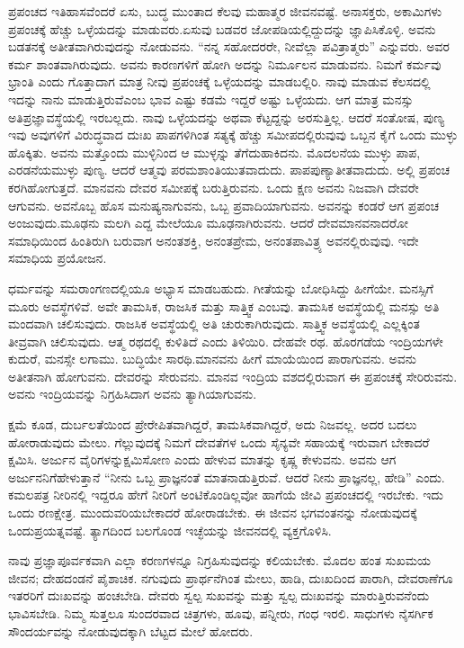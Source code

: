 ಪ್ರಪಂಚದ ಇತಿಹಾಸವೆಂದರೆ ಏಸು, ಬುದ್ಧ ಮುಂತಾದ ಕೆಲವು ಮಹಾತ್ಮರ ಜೀವನವಷ್ಟೆ. ಅನಾಸಕ್ತರು, ಅಕಾಮಿಗಳು ಪ್ರಪಂಚಕ್ಕೆ ಹೆಚ್ಚು ಒಳ್ಳೆಯದನ್ನು ಮಾಡುವರು.\break ಏಸುವು ಬಡವರ ಜೋಪಡಿಯಲ್ಲಿದ್ದುದನ್ನು ಜ್ಞಾಪಿಸಿಕೊಳ್ಳಿ. ಅವನು ಬಡತನಕ್ಕೆ ಅತೀತವಾಗಿ\-ರುವುದನ್ನು ನೋಡುವನು. “ನನ್ನ ಸಹೋದರರೇ, ನೀವೆಲ್ಲಾ ಪವಿತ್ರಾತ್ಮರು” ಎನ್ನುವರು. ಅವರ ಕರ್ಮ ಶಾಂತವಾಗಿರುವುದು. ಅವನು ಕಾರಣಗಳಿಗೆ ಹೋಗಿ ಅದನ್ನು ನಿರ್ಮೂಲನ ಮಾಡುವನು. ನಿಮಗೆ ಕರ್ಮವು ಭ್ರಾಂತಿ ಎಂದು ಗೊತ್ತಾದಾಗ ಮಾತ್ರ ನೀವು ಪ್ರಪಂಚಕ್ಕೆ ಒಳ್ಳೆಯದನ್ನು ಮಾಡಬಲ್ಲಿರಿ. ನಾವು ಮಾಡುವ ಕೆಲಸದಲ್ಲಿ ಇದನ್ನು ನಾನು ಮಾಡುತ್ತಿರುವೆ\break ಎಂಬ ಭಾವ ಎಷ್ಟು ಕಡಮೆ ಇದ್ದರೆ ಅಷ್ಟು ಒಳ್ಳೆಯದು. ಆಗ ಮಾತ್ರ ಮನಸ್ಸು ಅತಿಪ್ರಜ್ಞಾವಸ್ಥೆಯಲ್ಲಿ ಇರಬಲ್ಲದು. ನಾವು ಒಳ್ಳೆಯದನ್ನು ಅಥವಾ ಕೆಟ್ಟದ್ದನ್ನು ಅರಸುತ್ತಿಲ್ಲ. ಆದರೆ ಸಂತೋಷ, ಪುಣ್ಯ ಇವು ಅವುಗಳಿಗೆ ವಿರುದ್ಧವಾದ ದುಃಖ ಪಾಪಗಳಿಗಿಂತ ಸತ್ಯಕ್ಕೆ ಹೆಚ್ಚು ಸಮೀಪದಲ್ಲಿರುವುವು ಒಬ್ಬನ ಕೈಗೆ ಒಂದು ಮುಳ್ಳು ಹೊಕ್ಕಿತು. ಅವನು ಮತ್ತೊಂದು ಮುಳ್ಳಿನಿಂದ ಆ ಮುಳ್ಳನ್ನು ತೆಗೆದುಹಾಕಿದನು. ಮೊದಲನೆಯ ಮುಳ್ಳು ಪಾಪ, ಎರಡನೆಯ\break ಮುಳ್ಳು ಪುಣ್ಯ. ಆದರೆ ಆತ್ಮವು ಪರಮಶಾಂತಿಯುತವಾದುದು. ಪಾಪಪುಣ್ಯಾತೀತ\break ವಾದುದು. ಅಲ್ಲಿ ಪ್ರಪಂಚ ಕರಗಿಹೋಗುತ್ತದೆ. ಮಾನವನು ದೇವರ ಸಮೀಪಕ್ಕೆ ಬರುತ್ತಿರುವನು. ಒಂದು ಕ್ಷಣ ಅವನು ನಿಜವಾಗಿ ದೇವರೇ ಆಗುವನು. ಅವನೊಬ್ಬ ಹೊಸ ಮನುಷ್ಯನಾಗುವನು, ಒಬ್ಬ ಪ್ರವಾದಿಯಾಗುವನು. ಅವನನ್ನು ಕಂಡರೆ ಆಗ ಪ್ರಪಂಚ ಅಂಜುವುದು.\break ಮೂಢನು ಮಲಗಿ ಎದ್ದ ಮೇಲೆಯೂ ಮೂಢನಾಗಿರುವನು. ಆದರೆ ದೇವಮಾನವನಾದರೋ ಸಮಾಧಿಯಿಂದ ಹಿಂತಿರುಗಿ ಬರುವಾಗ ಅನಂತಶಕ್ತಿ, ಅನಂತಪ್ರೇಮ, ಅನಂತಪಾವಿತ್ರ್ಯ ಅವನಲ್ಲಿರುವುವು. ಇದೇ ಸಮಾಧಿಯ ಪ್ರಯೋಜನ.

ಧರ್ಮವನ್ನು ಸಮರಾಂಗಣದಲ್ಲಿಯೂ ಅಭ್ಯಾಸ ಮಾಡಬಹುದು. ಗೀತೆಯನ್ನು ಬೋಧಿಸಿದ್ದು ಹೀಗೆಯೇ. ಮನಸ್ಸಿಗೆ ಮೂರು ಅವಸ್ಥೆಗಳಿವೆ. ಅವೇ ತಾಮಸಿಕ, ರಾಜಸಿಕ ಮತ್ತು ಸಾತ್ತ್ವಿಕ ಎಂಬವು. ತಾಮಸಿಕ ಅವಸ್ಥೆಯಲ್ಲಿ ಮನಸ್ಸು ಅತಿ ಮಂದವಾಗಿ ಚಲಿಸುವುದು. ರಾಜಸಿಕ ಅವಸ್ಥೆಯಲ್ಲಿ ಅತಿ ಚುರುಕಾಗಿರುವುದು. ಸಾತ್ತ್ವಿಕ ಅವಸ್ಥೆಯಲ್ಲಿ ಎಲ್ಲಕ್ಕಿಂತ ತೀವ್ರವಾಗಿ ಚಲಿಸುವುದು. ಆತ್ಮ ರಥದಲ್ಲಿ ಕುಳಿತಿದೆ ಎಂದು ತಿಳಿಯಿರಿ. ದೇಹವೇ ರಥ. ಹೊರಗಡೆಯ ಇಂದ್ರಿಯಗಳೇ ಕುದುರೆ, ಮನಸ್ಸೇ ಲಗಾಮು. ಬುದ್ಧಿಯೇ ಸಾರಥಿ.\break ಮಾನವನು ಹೀಗೆ ಮಾಯೆಯಿಂದ ಪಾರಾಗುವನು. ಅವನು ಅತೀತನಾಗಿ ಹೋಗುವನು. ದೇವರನ್ನು ಸೇರುವನು. ಮಾನವ ಇಂದ್ರಿಯ ವಶದಲ್ಲಿರುವಾಗ ಈ ಪ್ರಪಂಚಕ್ಕೆ ಸೇರಿರುವನು. ಅವನು ಇಂದ್ರಿಯವನ್ನು ನಿಗ್ರಹಿಸಿದಾಗ ಅವನು ತ್ಯಾಗಿಯಾಗುವನು.

ಕ್ಷಮೆ ಕೂಡ, ದುರ್ಬಲತೆಯಿಂದ ಪ್ರೇರೇಪಿತವಾಗಿದ್ದರೆ, ತಾಮಸಿಕವಾಗಿದ್ದರೆ, ಅದು ನಿಜವಲ್ಲ. ಅದರ ಬದಲು ಹೋರಾಡುವುದು ಮೇಲು. ಗೆಲ್ಲುವುದಕ್ಕೆ ನಿಮಗೆ ದೇವತೆಗಳ ಒಂದು ಸೈನ್ಯವೇ ಸಹಾಯಕ್ಕೆ ಇರುವಾಗ ಬೇಕಾದರೆ ಕ್ಷಮಿಸಿ. ಅರ್ಜುನ ವೈರಿಗಳನ್ನು\break ಕ್ಷಮಿಸೋಣ ಎಂದು ಹೇಳುವ ಮಾತನ್ನು ಕೃಷ್ಣ ಕೇಳುವನು. ಅವನು ಆಗ ಅರ್ಜುನನಿಗೆ\break ಹೇಳುತ್ತಾನೆ “ನೀನು ಒಬ್ಬ ಪ್ರಾಜ್ಞನಂತೆ ಮಾತನಾಡುತ್ತಿರುವೆ. ಆದರೆ ನೀನು ಪ್ರಾಜ್ಞನಲ್ಲ, ಹೇಡಿ” ಎಂದು. ಕಮಲಪತ್ರ ನೀರಿನಲ್ಲಿ ಇದ್ದರೂ ಹೇಗೆ ನೀರಿಗೆ ಅಂಟಿಕೊಂಡಿಲ್ಲವೋ ಹಾಗೆಯೆ ಜೀವಿ ಪ್ರಪಂಚದಲ್ಲಿ ಇರಬೇಕು. ಇದು ಒಂದು ರಣಕ್ಷೇತ್ರ. ಮುಂದುವರಿಯಬೇಕಾದರೆ ಹೋರಾಡಬೇಕು. ಈ ಜೀವನ ಭಗವಂತನನ್ನು ನೋಡುವುದಕ್ಕೆ ಒಂದು\break ಪ್ರಯತ್ನವಷ್ಟೆ. ತ್ಯಾಗದಿಂದ ಬಲಗೊಂಡ ಇಚ್ಛೆಯನ್ನು ಜೀವನದಲ್ಲಿ ವ್ಯಕ್ತಗೊಳಿಸಿ.

ನಾವು ಪ್ರಜ್ಞಾಪೂರ್ವಕವಾಗಿ ಎಲ್ಲಾ ಕರಣಗಳನ್ನೂ ನಿಗ್ರಹಿಸುವುದನ್ನು ಕಲಿಯಬೇಕು. ಮೊದಲ ಹಂತ ಸುಖಮಯ ಜೀವನ; ದೇಹದಂಡನೆ ಪೈಶಾಚಿಕ. ನಗುವುದು ಪ್ರಾರ್ಥನೆಗಿಂತ ಮೇಲು, ಹಾಡಿ, ದುಃಖದಿಂದ ಪಾರಾಗಿ, ದೇವರಾಣೆಗೂ ಇತರರಿಗೆ ದುಃಖವನ್ನು ಹಂಚಬೇಡಿ. ದೇವರು ಸ್ವಲ್ಪ ಸುಖವನ್ನು ಮತ್ತು ಸ್ವಲ್ಪ ದುಃಖವನ್ನು ಮಾರುತ್ತಿರುವನೆಂದು ಭಾವಿಸಬೇಡಿ. ನಿಮ್ಮ ಸುತ್ತಲೂ ಸುಂದರವಾದ ಚಿತ್ರಗಳು, ಹೂವು, ಪನ್ನೀರು, ಗಂಧ ಇರಲಿ. ಸಾಧುಗಳು ನೈಸರ್ಗಿಕ ಸೌಂದರ್ಯವನ್ನು ನೋಡುವುದಕ್ಕಾಗಿ ಬೆಟ್ಟದ ಮೇಲೆ ಹೋದರು.

